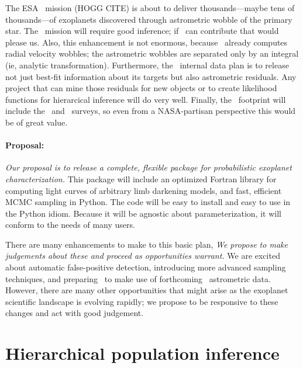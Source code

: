 \documentclass[letterpaper,12pt,preprint]{hack_aastex}
\newcommand{\Bart}{\package{Bart}}
\begin{document}
The ESA \Gaia\ mission (HOGG CITE) is about to deliver
thousands---maybe tens of thousands---of exoplanets discovered through
astrometric wobble of the primary star.  The \Gaia\ mission will
require good inference; if \Bart\ can contribute that would please us.
Also, this enhancement is not enormous, because \Bart\ already
computes radial velocity wobbles; the astrometric wobbles are
separated only by an integral (ie, analytic transformation).
Furthermore, the \Gaia\ internal data plan is to release not just
best-fit information about its targets but also astrometric residuals.
Any project that can mine those residuals for new objects or to create
likelihood functions for hierarcical inference will do very well.
Finally, the \Gaia\ footprint will include the \Kepler\ and
\TESS\ surveys, so even from a NASA-partisan perspective this would be
of great value.


\paragraph{Proposal:}
\emph{Our proposal is to release a complete, flexible package for
  probabilistic exoplanet characterization.}  This package will
include an optimized Fortran library for computing light curves of
arbitrary limb darkening models, and fast, efficient MCMC sampling in
Python.  The code will be easy to install and easy to use in the
Python idiom.  Because it will be agnostic about parameterization, it
will conform to the needs of many users.

There are many enhancements to make to this basic plan, \emph{We
  propose to make judgements about these and proceed as opportunities
  warrant.}  We are excited about automatic false-positive detection,
introducing more advanced sampling techniques, and preparing \Bart\ to
make use of forthcoming \Gaia\ astrometric data.  However, there are
many other opportunities that might arise as the exoplanet scientific
landscape is evolving rapidly; we propose to be responsive to these
changes and act with good judgement.

\section{Hierarchical population inference}
\end{document}
